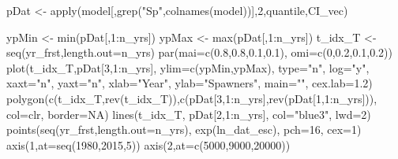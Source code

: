 \documentclass[
  11pt,
]{article}
\newenvironment{Shaded}{}{}
\newcommand{\DataTypeTok}[1]{#1}
\newcommand{\DecValTok}[1]{#1}
\newcommand{\FloatTok}[1]{#1}
\newcommand{\KeywordTok}[1]{\textcolor[rgb]{0.00,0.00,1.00}{#1}}
\newcommand{\NormalTok}[1]{#1}
\newcommand{\OperatorTok}[1]{#1}
\newcommand{\OtherTok}[1]{\textcolor[rgb]{1.00,0.25,0.00}{#1}}
\newcommand{\StringTok}[1]{\textcolor[rgb]{0.00,0.50,0.50}{#1}}
\begin{document}
\begin{Shaded}
\begin{Highlighting}[]
\NormalTok{pDat <-}\StringTok{ }\KeywordTok{apply}\NormalTok{(model[,}\KeywordTok{grep}\NormalTok{(}\StringTok{"Sp"}\NormalTok{,}\KeywordTok{colnames}\NormalTok{(model))],}\DecValTok{2}\NormalTok{,quantile,CI_vec)}

\NormalTok{ypMin <-}\StringTok{ }\KeywordTok{min}\NormalTok{(pDat[,}\DecValTok{1}\OperatorTok{:}\NormalTok{n_yrs])}
\NormalTok{ypMax <-}\StringTok{ }\KeywordTok{max}\NormalTok{(pDat[,}\DecValTok{1}\OperatorTok{:}\NormalTok{n_yrs])}
\NormalTok{t_idx_T <-}\StringTok{ }\KeywordTok{seq}\NormalTok{(yr_frst,}\DataTypeTok{length.out=}\NormalTok{n_yrs)}
\KeywordTok{par}\NormalTok{(}\DataTypeTok{mai=}\KeywordTok{c}\NormalTok{(}\FloatTok{0.8}\NormalTok{,}\FloatTok{0.8}\NormalTok{,}\FloatTok{0.1}\NormalTok{,}\FloatTok{0.1}\NormalTok{), }\DataTypeTok{omi=}\KeywordTok{c}\NormalTok{(}\DecValTok{0}\NormalTok{,}\FloatTok{0.2}\NormalTok{,}\FloatTok{0.1}\NormalTok{,}\FloatTok{0.2}\NormalTok{))}
\KeywordTok{plot}\NormalTok{(t_idx_T,pDat[}\DecValTok{3}\NormalTok{,}\DecValTok{1}\OperatorTok{:}\NormalTok{n_yrs], }\DataTypeTok{ylim=}\KeywordTok{c}\NormalTok{(ypMin,ypMax), }\DataTypeTok{type=}\StringTok{"n"}\NormalTok{, }\DataTypeTok{log=}\StringTok{"y"}\NormalTok{, }\DataTypeTok{xaxt=}\StringTok{"n"}\NormalTok{, }\DataTypeTok{yaxt=}\StringTok{"n"}\NormalTok{,}
     \DataTypeTok{xlab=}\StringTok{"Year"}\NormalTok{, }\DataTypeTok{ylab=}\StringTok{"Spawners"}\NormalTok{, }\DataTypeTok{main=}\StringTok{""}\NormalTok{, }\DataTypeTok{cex.lab=}\FloatTok{1.2}\NormalTok{)}
\KeywordTok{polygon}\NormalTok{(}\KeywordTok{c}\NormalTok{(t_idx_T,}\KeywordTok{rev}\NormalTok{(t_idx_T)),}\KeywordTok{c}\NormalTok{(pDat[}\DecValTok{3}\NormalTok{,}\DecValTok{1}\OperatorTok{:}\NormalTok{n_yrs],}\KeywordTok{rev}\NormalTok{(pDat[}\DecValTok{1}\NormalTok{,}\DecValTok{1}\OperatorTok{:}\NormalTok{n_yrs])), }\DataTypeTok{col=}\NormalTok{clr, }\DataTypeTok{border=}\OtherTok{NA}\NormalTok{)}
\KeywordTok{lines}\NormalTok{(t_idx_T, pDat[}\DecValTok{2}\NormalTok{,}\DecValTok{1}\OperatorTok{:}\NormalTok{n_yrs], }\DataTypeTok{col=}\StringTok{"blue3"}\NormalTok{, }\DataTypeTok{lwd=}\DecValTok{2}\NormalTok{)}
\KeywordTok{points}\NormalTok{(}\KeywordTok{seq}\NormalTok{(yr_frst,}\DataTypeTok{length.out=}\NormalTok{n_yrs), }\KeywordTok{exp}\NormalTok{(ln_dat_esc), }\DataTypeTok{pch=}\DecValTok{16}\NormalTok{, }\DataTypeTok{cex=}\DecValTok{1}\NormalTok{)}
\KeywordTok{axis}\NormalTok{(}\DecValTok{1}\NormalTok{,}\DataTypeTok{at=}\KeywordTok{seq}\NormalTok{(}\DecValTok{1980}\NormalTok{,}\DecValTok{2015}\NormalTok{,}\DecValTok{5}\NormalTok{))}
\KeywordTok{axis}\NormalTok{(}\DecValTok{2}\NormalTok{,}\DataTypeTok{at=}\KeywordTok{c}\NormalTok{(}\DecValTok{5000}\NormalTok{,}\DecValTok{9000}\NormalTok{,}\DecValTok{20000}\NormalTok{))}
\end{Highlighting}
\end{Shaded}
\end{document}
